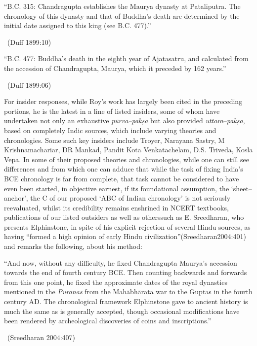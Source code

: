 \begin{myquote}
“B.C. 315: Chandragupta establishes the Maurya dynasty at Pataliputra. The chronology of this dynasty and that of Buddha's death are determined by the initial date assigned to this king (see B.C. 477).” 

~\hfill (Duff 1899:10)
\end{myquote}

\begin{myquote}
“B.C. 477: Buddha's death in the eighth year of Ajatasatru, and calculated from the accession of Chandragupta, Maurya, which it preceded by 162 years.” 

~\hfill (Duff 1899:06)
\end{myquote}

For insider responses, while Roy’s work has largely been cited in the preceding portions, he is the latest in a line of listed insiders, some of whom have undertaken not only an exhaustive \textit{pūrva–pakṣa} but also provided \textit{uttara}–\textit{pakṣa}, based on completely Indic sources, which include varying theories and chronologies. Some such key insiders include Troyer, Narayana Sastry, M Krishnamachariar, DR Mankad, Pandit Kota Venkatachelam, D.S. Triveda, Kosla Vepa. In some of their proposed theories and chronologies, while one can still see differences and from which one can adduce that while the task of fixing India’s BCE chronology is far from complete, that task cannot be considered to have even been started, in objective earnest, if its foundational assumption, the ‘sheet–anchor’, the C of our proposed ‘ABC of Indian chronology’ is not seriously reevaluated, whilst its credibility remains enshrined in NCERT textbooks, publications of our listed outsiders as well as otherssuch as E. Sreedharan, who presents Elphinstone, in spite of his explicit rejection of several Hindu sources, as having “formed a high opinion of early Hindu civilization”(Sreedharan2004:401) and remarks the following, about his method:

\begin{myquote}
“And now, without any difficulty, he fixed Chandragupta Maurya’s accession towards the end of fourth century BCE. Then counting backwards and forwards from this one point, he fixed the approximate dates of the royal dynasties mentioned in the \textit{Puranas} from the Mahābhārata war to the Guptas in the fourth century AD. The chronological framework Elphinstone gave to ancient history is much the same as is generally accepted, though occasional modifications have been rendered by archeological discoveries of coins and inscriptions.” 

~\hfill (Sreedharan 2004:407)
\end{myquote}

